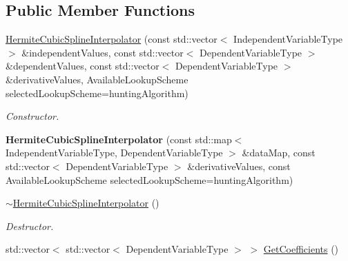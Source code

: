 \subsection*{Public Member Functions}
\begin{DoxyCompactItemize}
\item 
\hyperlink{classtudat_1_1interpolators_1_1HermiteCubicSplineInterpolator_a0a1914c7a7c52351b9ee775ef2303a5c}{Hermite\+Cubic\+Spline\+Interpolator} (const std\+::vector$<$ Independent\+Variable\+Type $>$ \&independent\+Values, const std\+::vector$<$ Dependent\+Variable\+Type $>$ \&dependent\+Values, const std\+::vector$<$ Dependent\+Variable\+Type $>$ \&derivative\+Values, Available\+Lookup\+Scheme selected\+Lookup\+Scheme=hunting\+Algorithm)\hypertarget{classtudat_1_1interpolators_1_1HermiteCubicSplineInterpolator_a0a1914c7a7c52351b9ee775ef2303a5c}{}\label{classtudat_1_1interpolators_1_1HermiteCubicSplineInterpolator_a0a1914c7a7c52351b9ee775ef2303a5c}

\begin{DoxyCompactList}\small\item\em Constructor. \end{DoxyCompactList}\item 
{\bfseries Hermite\+Cubic\+Spline\+Interpolator} (const std\+::map$<$ Independent\+Variable\+Type, Dependent\+Variable\+Type $>$ \&data\+Map, const std\+::vector$<$ Dependent\+Variable\+Type $>$ \&derivative\+Values, const Available\+Lookup\+Scheme selected\+Lookup\+Scheme=hunting\+Algorithm)\hypertarget{classtudat_1_1interpolators_1_1HermiteCubicSplineInterpolator_a428a9dd73111a939a84a1b7d9b742b48}{}\label{classtudat_1_1interpolators_1_1HermiteCubicSplineInterpolator_a428a9dd73111a939a84a1b7d9b742b48}

\item 
\hyperlink{classtudat_1_1interpolators_1_1HermiteCubicSplineInterpolator_a5b0bba307773a7a60a5d0f92cc886d77}{$\sim$\+Hermite\+Cubic\+Spline\+Interpolator} ()\hypertarget{classtudat_1_1interpolators_1_1HermiteCubicSplineInterpolator_a5b0bba307773a7a60a5d0f92cc886d77}{}\label{classtudat_1_1interpolators_1_1HermiteCubicSplineInterpolator_a5b0bba307773a7a60a5d0f92cc886d77}

\begin{DoxyCompactList}\small\item\em Destructor. \end{DoxyCompactList}\item 
std\+::vector$<$ std\+::vector$<$ Dependent\+Variable\+Type $>$ $>$ \hyperlink{classtudat_1_1interpolators_1_1HermiteCubicSplineInterpolator_a4d03b7ea0c2b5df565be79160b091134}{Get\+Coefficients} ()\hypertarget{classtudat_1_1interpolators_1_1HermiteCubicSplineInterpolator_a4d03b7ea0c2b5df565be79160b091134}{}\label{classtudat_1_1interpolators_1_1HermiteCubicSplineInterpolator_a4d03b7ea0c2b5df565be79160b091134}


\end{DoxyCompactItemize}
